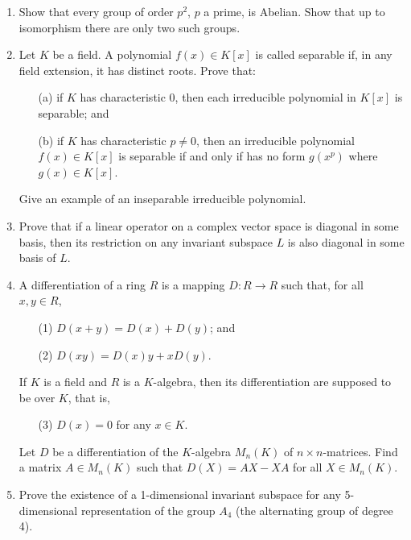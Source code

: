 \documentclass{article}
\begin{document}
\begin{enumerate}
    \item Show that every group of order \(p^2\), \(p\) a prime, is Abelian. Show that up to isomorphism there are only two such groups.

    \item Let \(K\) be a field. A polynomial \(f(x) \in K[x]\) is called separable if, in any field extension, it has distinct roots. Prove that:
    \begin{itemize}
        \item[(a)] if \(K\) has characteristic 0, then each irreducible polynomial in \(K[x]\) is separable; and
        \item[(b)] if \(K\) has characteristic \(p \neq 0\), then an irreducible polynomial \(f(x) \in K[x]\) is separable if and only if has no form \(g(x^p)\) where \(g(x) \in K[x]\).
    \end{itemize}
    Give an example of an inseparable irreducible polynomial.

    \item Prove that if a linear operator on a complex vector space is diagonal in some basis, then its restriction on any invariant subspace \(L\) is also diagonal in some basis of \(L\).

    \item A differentiation of a ring \(R\) is a mapping \(D : R \to R\) such that, for all \(x, y \in R\),
    \begin{itemize}
        \item[(1)] \(D(x + y) = D(x) + D(y)\); and
        \item[(2)] \(D(xy) = D(x)y + xD(y)\).
    \end{itemize}
    If \(K\) is a field and \(R\) is a \(K\)-algebra, then its differentiation are supposed to be over \(K\), that is,
    \begin{itemize}
        \item[(3)] \(D(x) = 0\) for any \(x \in K\).
    \end{itemize}
    Let \(D\) be a differentiation of the \(K\)-algebra \(M_n(K)\) of \(n \times n\)-matrices. Find a matrix \(A \in M_n(K)\) such that \(D(X) = AX - XA\) for all \(X \in M_n(K)\).

    \item Prove the existence of a 1-dimensional invariant subspace for any 5-dimensional representation of the group \(A_4\) (the alternating group of degree 4).
\end{enumerate}
\end{document}
